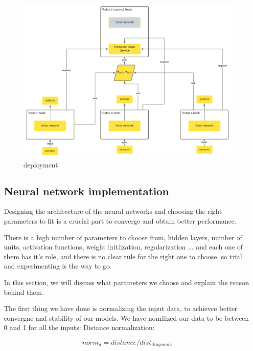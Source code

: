 \documentclass[12pt]{extarticle}
\begin{document}
 \begin{figure}[h]  
\centering
\includegraphics[scale=1.2]{deployment}
\caption[deployment]{deployment}
\end{figure}










 
\newpage




\subsection{Neural network implementation}
Designing the architecture of the neural networks and choosing the right parameters to fit is a crucial part to converge and obtain better performance.

There is a high  number of  parameters to choose from,  hidden layers, number of units, activation functions, weight initlization, regularization ... and each one of them has it's role, and there is no clear rule for the right one to choose, so trial and experimenting is the way to go.

In this section, we will discuss what parameters we choose and explain the reason behind them.

The first thing we have done is normalizing the input data, to achievce better convergne and stability of our models.
We have nomilized our data to be between 0 and 1 for all the inputs:
\pagebreak
Distance normalization:

  \begin{equation} \label{dist_norm}
     norm_d=distance/dist_{diagonale} 
   \end{equation}
   
\end{document}
